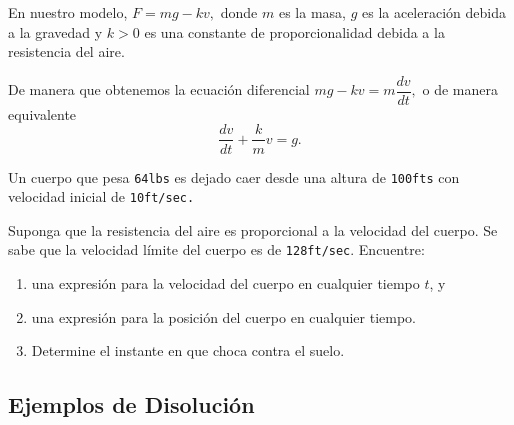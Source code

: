 	En nuestro modelo, $F= mg - kv,$ donde $m$ es la masa, $g$ es la aceleración debida a la gravedad y $k>0$ es una constante de proporcionalidad debida a la resistencia del aire.



	De manera que obtenemos la ecuación diferencial $mg-kv=m\dfrac{dv}{dt},$ o de manera equivalente
	\begin{equation}
		\label{bron:7.4}
		\dfrac{dv}{dt}+\dfrac{k}{m}v=g.
	\end{equation}
	



% 
%
%
% 

{}
	\begin{problema}
		Un cuerpo que pesa \texttt{64lbs} es dejado caer desde una altura de \texttt{100fts} con velocidad inicial de \texttt{10ft/sec.}
		
		Suponga que la resistencia del aire es proporcional a la velocidad del cuerpo. Se sabe que la velocidad límite del cuerpo es de \texttt{128ft/sec}. Encuentre:
		\begin{enumerate}
			\item una expresión para la velocidad del cuerpo en cualquier tiempo $t$,  y
			\item una expresión para la posición del cuerpo en cualquier tiempo.
			\item Determine el instante en que choca contra el suelo.
		\end{enumerate}
		
	\end{problema}
	


\subsection{Ejemplos de Disolución}


